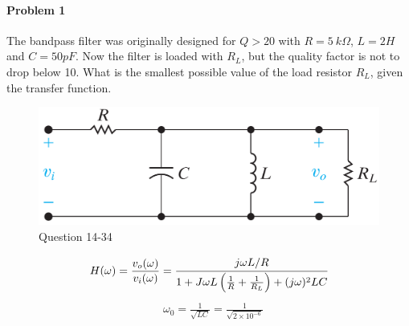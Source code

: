 \documentclass[lang=en]{skrapport}
\begin{document}
	
\paragraph{Problem 1}

The bandpass filter was originally designed for $Q > 20$ with $R = 5 \ k\Omega$, $L = 2 H$ and $C = 50 pF$. Now the filter is loaded with $R_L$, but the quality factor is not to drop below 10. What is the smallest possible value of the load resistor $R_L$, given the transfer function.
\begin{figure}
	\centering
	\includegraphics[width=1\linewidth]{question1.png}
	\caption{Question 14-34}
	\label{fig:question1}
\end{figure}
\[
H(\omega)=\frac{v_o(\omega)}{v_i(\omega)}=\cfrac{j \omega L / R}{1+J\omega L \left(\frac{1}{R}+\frac{1}{R_L}\right) + (j \omega)^2 LC}
\]
\begin{align*}
& \omega_0 = \frac{1}{\sqrt{LC}} = \frac{1}{\sqrt{2 \times 10^{-6}}}
\end{align*}
\end{document}
